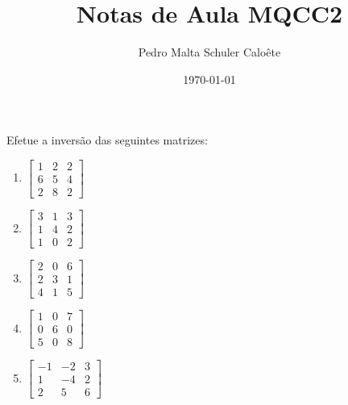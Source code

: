 \documentclass[12pt,a4paper]{memoir}
\title{Notas de Aula MQCC2}
\author{Pedro Malta Schuler Caloête}
\date{\today}
\begin{document}
  Efetue a inversão das seguintes matrizes:
  \begin{enumerate}
    \item \(\begin{bmatrix}
        1 & 2 & 2\\
        6 & 5 & 4\\
        2 & 8 & 2
      \end{bmatrix}\)
    \item \(\begin{bmatrix}
      3 & 1 & 3\\
      1 & 4 & 2\\
      1 & 0 & 2
    \end{bmatrix}\)
  \item \(\begin{bmatrix}
      2 & 0 & 6\\
      2 & 3 & 1\\
      4 & 1 & 5
    \end{bmatrix}\)
  \item \(\begin{bmatrix}
      1 & 0 & 7\\
      0 & 6 & 0\\
      5 & 0 & 8
    \end{bmatrix}\)
  \item \(\begin{bmatrix}
      -1 & -2 & 3\\
      1 & -4 & 2\\
      2 & 5 & 6
    \end{bmatrix}\)
\end{enumerate}
\end{document}
